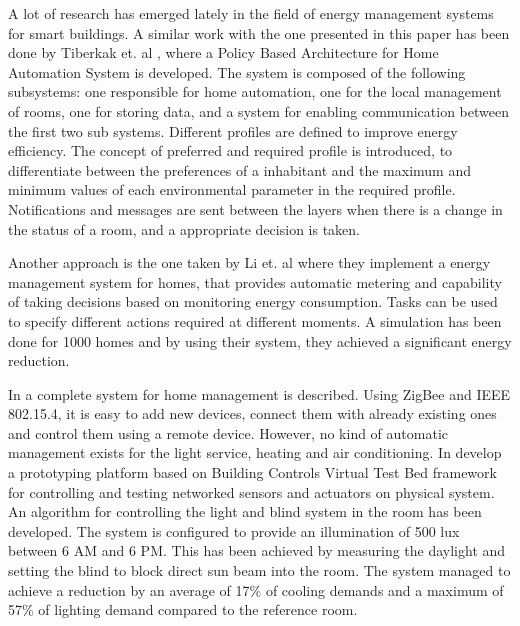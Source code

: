 \label{chap:relatedwork}
A lot of research has emerged lately in the field of energy management systems for smart buildings. 
A similar work with the one presented in this paper has been done by Tiberkak et. al \cite{Tiberkak10}, where a Policy Based Architecture for Home Automation
System is developed. The system is composed of the following subsystems: one responsible
for home automation, one for the local management of rooms, one for storing data, and a system for enabling communication between the first two sub systems. Different profiles are defined to improve energy efficiency.
The concept of preferred and required profile is introduced, to differentiate between the preferences of a inhabitant and the maximum and minimum values of each environmental parameter in the required profile. Notifications
and messages are sent between the layers when there is a change in the status of a room, and a appropriate decision is taken.

Another approach is the one taken by Li et. al \cite{Li11} where they implement a energy management system for homes, that provides automatic metering and capability of taking decisions based on monitoring energy consumption. 
Tasks can be used to specify different actions required at different moments. A simulation has been done for 1000 homes and by using their system, they achieved a significant energy reduction.

In \cite{Han10} a complete system for home management is described. Using ZigBee and IEEE 802.15.4, it is easy to add new devices, connect them with already existing ones and control them using a remote device. However, no kind of automatic management exists for the light service, heating and air conditioning. In \cite{Wen11} develop a prototyping platform based on Building Controls Virtual Test Bed framework \cite{Bcvtb} for controlling and testing networked sensors and actuators on physical system. An algorithm for controlling the light and blind system in the room has been developed. The system is configured to provide an illumination of 500 lux between 6 AM and 6 PM. This has been achieved by measuring the daylight and setting the blind to block direct sun beam into the room. The system managed to achieve a reduction by an average of 17\% of cooling demands and a maximum of 57\% of lighting demand compared to the reference room.

